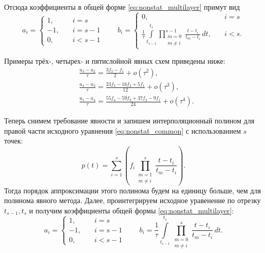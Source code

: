 Отсюда коэффициенты в общей форме \cref{eq:nonstat_multilayer} примут вид
\begin{equation*}
a_i = 
\begin{cases}
1,  &\quad i = s\\
-1, &\quad i = s-1\\
0,  &\quad i < s-1
\end{cases}
\qquad
b_i =
\begin{cases}
0, &\quad i = s\\[10pt]
\displaystyle\frac{1}{\tau}\int\limits_{t_{s-1}}^{t_s} \prod \limits_{\substack{m=0\\m\neq i}}^{s-1} \frac{t - t_i}{t_m - t_i}\, dt, &\quad i < s.
\end{cases}
\end{equation*}

Примеры трёх-, четырех- и пятислойной явных схем приведены ниже:
\begin{align*}
&\frac{u_3 - u_2}{\tau} = \frac{3f_2 - f_1}{2} + o(\tau^2),\\
&\frac{u_4 - u_3}{\tau} = \frac{23 f_3 - 16 f_2 + 5 f_1}{12} + o(\tau^3),\\
&\frac{u_5 - u_4}{\tau} = \frac{55 f_4 - 59 f_3 + 37 f_2 - 9 f_1}{24} + o(\tau^4).
\end{align*}

Теперь снимем требование явности и запишем интерполяционный полином для правой части исходного уравнения \cref{eq:nonstat_common} с использованием $s$ точек:
\begin{equation*}
p(t) = \sum\limits_{i=1}^{s}\left(f_i \prod\limits_{\substack{m=1\\m \neq i}}^{s} \frac{t - t_i}{t_m - t_i} \right).
\end{equation*}
Тогда порядок аппроксимации этого полинома будем на единицу больше, чем для полинома явного метода.
Далее, проинтегрируем исходное уравенение по отрезку $t_{s-1}, t_s$ и получим коэффициенты общей формы \cref{eq:nonstat_multilayer}:
\begin{equation*}
a_i = 
\begin{cases}
1,  &\quad i = s\\
-1, &\quad i = s-1\\
0,  &\quad i < s-1
\end{cases}
\qquad
b_i =
\displaystyle\frac{1}{\tau}\int\limits_{t_{s-1}}^{t_s} \prod \limits_{\substack{m=0\\m\neq i}}^{s} \frac{t - t_i}{t_m - t_i}\, dt.
\end{equation*}

